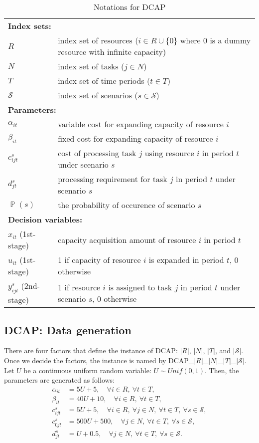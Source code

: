 \documentclass[11pt]{article}
\DeclareMathOperator*{\PP}{\mathbb{P}}
\newcommand{\dcap}{\textsf{DCAP}}
\begin{document}
\begin{table}[H]
	\caption{Notations for \dcap}
	\label{dcap:notation}
	\resizebox{\textwidth}{!}
	{
		\begin{tabular}{ll}
			\toprule
			\multicolumn{2}{l}{\textbf{Index sets:}} \\
			$R$ & index set of resources ($i\in R\cup\{0\}$ where $0$ is a dummy resource with infinite capacity) \\ 
			$N$ & index set of tasks ($j\in N$)\\ 
			$T$ & index set of time periods ($t\in T$)\\
			$\mathcal{S}$ & index set of scenarios ($s\in \mathcal{S}$) \\ \midrule
			\multicolumn{2}{l}{\textbf{Parameters:}} \\
			$\alpha_{it}$ & variable cost for expanding capacity of resource $i$\\ 
			$\beta_{it}$ & fixed cost for expanding capacity of resource $i$ \\ 
			$c_{ijt}^{s}$ & cost of processing task $j$ using resource $i$ in period $t$ under scenario $s$ \\ 
			$d_{jt}^s$	& processing requirement for task $j$ in period $t$ under scenario $s$		\\
			$\PP(s)$ & \textrm{the probability of occurence of scenario $s$} \\ \midrule
			\multicolumn{2}{l}{\textbf{Decision variables:}} \\
			$x_{it}$ (1st-stage) & capacity acquisition amount of resource $i$ in period $t$ \\ 
			$u_{it}$ (1st-stage)& 1 if capacity of resource $i$ is expanded in period $t$, 0 otherwise \\ 
			$y_{ijt}^s$ (2nd-stage)& 1 if resource $i$ is assigned to task $j$ in period $t$ under scenario $s$, 0 otherwise\\
			\bottomrule
		\end{tabular}
	}
\end{table} 

\subsection{\dcap: Data generation} \label{subsubsec:dcap_data_gen}
There are four factors that define the instance of \dcap: $|R|$, $|N|$, $|T|$, and $|\mathcal{S}|$. Once we decide the factors, the instance is named by DCAP\_$|R|$\_$|N|$\_$|T|$\_$|\mathcal{S}|$. Let $U$ be a continuous uniform random variable: $U\sim Unif(0,1)$. Then, the parameters are generated as follows:
\begin{align*}
\alpha_{it}&=5U+5,\quad\forall i\in R,\ \forall t\in T, \\
\beta_{it} &=40U+10,\quad\forall i\in R,\ \forall t\in T, \\
c_{ijt}^s  &=5U+5,\quad\forall i\in R,\ \forall j\in N,\ \forall t\in T,\ \forall s\in\mathcal{S}, \\
c_{0jt}^s  &=500U+500,\quad\forall j\in N,\ \forall t\in T,\ \forall s\in\mathcal{S}, \\
d_{jt}^s   &=U+0.5,\quad\forall j\in N,\ \forall t\in T,\ \forall s\in\mathcal{S}.
\end{align*}
\end{document}
